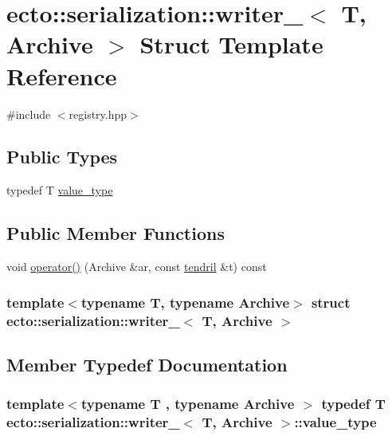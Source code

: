 \hypertarget{structecto_1_1serialization_1_1writer__}{\section{ecto\-:\-:serialization\-:\-:writer\-\_\-$<$ \-T, \-Archive $>$ \-Struct \-Template \-Reference}
\label{structecto_1_1serialization_1_1writer__}
}


{\ttfamily \#include $<$registry.\-hpp$>$}

\subsection*{\-Public \-Types}
\begin{DoxyCompactItemize}
\item 
typedef \-T \hyperlink{structecto_1_1serialization_1_1writer___a7a5dbe7d60f82a5e8d7eafe31be2c893}{value\-\_\-type}
\end{DoxyCompactItemize}
\subsection*{\-Public \-Member \-Functions}
\begin{DoxyCompactItemize}
\item 
void \hyperlink{structecto_1_1serialization_1_1writer___ae8cb26a463f934177654f5a0c3a397bb}{operator()} (\-Archive \&ar, const \hyperlink{classecto_1_1tendril}{tendril} \&t) const 
\end{DoxyCompactItemize}
\subsubsection*{template$<$typename T, typename Archive$>$ struct ecto\-::serialization\-::writer\-\_\-$<$ T, Archive $>$}



\subsection{\-Member \-Typedef \-Documentation}
\hypertarget{structecto_1_1serialization_1_1writer___a7a5dbe7d60f82a5e8d7eafe31be2c893}{
\subsubsection[{value\-\_\-type}]{\setlength{\rightskip}{0pt plus 5cm}template$<$typename T , typename Archive $>$ typedef \-T {\bf ecto\-::serialization\-::writer\-\_\-}$<$ \-T, \-Archive $>$\-::{\bf value\-\_\-type}}}\label{structecto_1_1serialization_1_1writer___a7a5dbe7d60f82a5e8d7eafe31be2c893}



